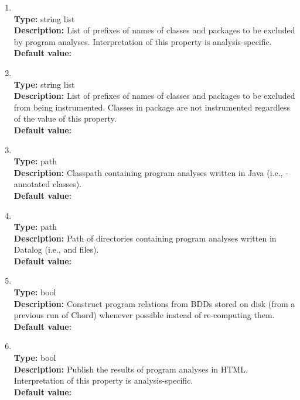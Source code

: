 \begin{enumerate}
\item
{} \\
{\bf Type:} string list \\
{\bf Description:} List of prefixes of names of classes and packages to be excluded by program analyses.  Interpretation of this property is analysis-specific. \\
{\bf Default value:}  

\item
{} \\
{\bf Type:} string list \\
{\bf Description:} List of prefixes of names of classes and packages to be excluded from being instrumented.  Classes in package  are not instrumented regardless of the value of this property. \\
{\bf Default value:}  

\item
{} \\
{\bf Type:} path \\
{\bf Description:} Classpath containing program analyses written in Java (i.e., -annotated classes). \\
{\bf Default value:}  

\item
{} \\
{\bf Type:} path \\
{\bf Description:} Path of directories containing program analyses written in Datalog (i.e.,  and  files). \\
{\bf Default value:}  

\item
{} \\
{\bf Type:} bool \\
{\bf Description:} Construct program relations from BDDs stored on disk (from a previous run of Chord) whenever possible instead of re-computing them. \\
{\bf Default value:} 

\item
{} \\
{\bf Type:} bool \\
{\bf Description:} Publish the results of program analyses in HTML.  Interpretation of this property is analysis-specific. \\
{\bf Default value:}  


\end{enumerate}
